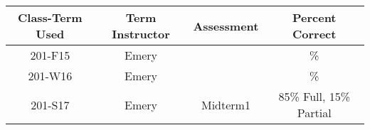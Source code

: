 \begin{outcomes}
	\begin{center}
		\begin{tabular}{cccc}
			\hline\hline
			Class-Term Used & Term Instructor & Assessment & Percent Correct\\
			\hline
			201-F15 & Emery &  & \%\\    %
			201-W16 & Emery &  & \%\\    %
			201-S17 & Emery & Midterm1 & 85\% Full, 15\% Partial\\    %
			\hline
		\end{tabular}
	\end{center}
\end{outcomes}

\begin{comments}
	
\end{comments}
